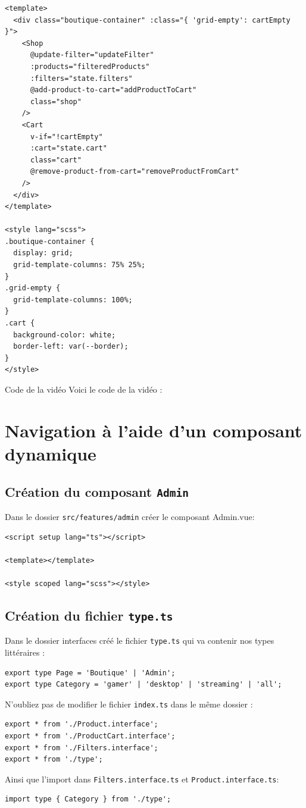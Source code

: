 \begin{verbatim}
<template>
  <div class="boutique-container" :class="{ 'grid-empty': cartEmpty }">
    <Shop
      @update-filter="updateFilter"
      :products="filteredProducts"
      :filters="state.filters"
      @add-product-to-cart="addProductToCart"
      class="shop"
    />
    <Cart
      v-if="!cartEmpty"
      :cart="state.cart"
      class="cart"
      @remove-product-from-cart="removeProductFromCart"
    />
  </div>
</template>

<style lang="scss">
.boutique-container {
  display: grid;
  grid-template-columns: 75% 25%;
}
.grid-empty {
  grid-template-columns: 100%;
}
.cart {
  background-color: white;
  border-left: var(--border);
}
</style>
\end{verbatim}

Code de la vidéo
Voici le code de la vidéo :

\section{Navigation à l'aide d'un composant dynamique}
\subsection{Création du composant {\tt Admin}}
Dans le dossier {\tt src/features/admin} créer le composant {\color{monOrange}Admin.vue}:
\begin{verbatim}
<script setup lang="ts"></script>

<template></template>

<style scoped lang="scss"></style>
\end{verbatim}
\subsection{Création du fichier {\tt type.ts}}
Dans le dossier {\color{monOrange}interfaces} créé le fichier {\tt type.ts} qui va contenir nos types littéraires :
\begin{verbatim}
export type Page = 'Boutique' | 'Admin';
export type Category = 'gamer' | 'desktop' | 'streaming' | 'all';
\end{verbatim}
N'oubliez pas de modifier le fichier {\tt index.ts} dans le même dossier :
\begin{verbatim}
export * from './Product.interface';
export * from './ProductCart.interface';
export * from './Filters.interface';
export * from './type';
\end{verbatim}
Ainsi que l'import dans {\tt Filters.interface.ts} et {\tt Product.interface.ts}:
\begin{verbatim}
import type { Category } from './type';
\end{verbatim}
